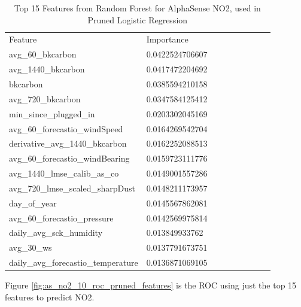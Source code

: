 \begin{table}[H]
\centering
\small
\begin{tabular}{lllllllll}
\\
\\
\toprule
Feature & Importance \\
\midrule
 avg\_60\_bkcarbon & 0.0422524706607 \\
 avg\_1440\_bkcarbon & 0.0417472204692 \\
 bkcarbon & 0.0385594210158 \\
 avg\_720\_bkcarbon & 0.0347584125412 \\
 min\_since\_plugged\_in & 0.0203302045169 \\
 avg\_60\_forecastio\_windSpeed & 0.0164269542704 \\
 derivative\_avg\_1440\_bkcarbon & 0.0162252088513 \\
 avg\_60\_forecastio\_windBearing & 0.0159723111776 \\
 avg\_1440\_lmse\_calib\_as\_co & 0.0149001557286 \\
 avg\_720\_lmse\_scaled\_sharpDust & 0.0148211173957 \\
 day\_of\_year & 0.0145567862081 \\
 avg\_60\_forecastio\_pressure & 0.0142569975814 \\
 daily\_avg\_sck\_humidity & 0.013849933762 \\
 avg\_30\_ws & 0.0137791673751 \\
 daily\_avg\_forecastio\_temperature & 0.0136871069105 \\
\bottomrule
\end{tabular}
\label{tab:as_no2_randomforest_features}
\caption{Top 15 Features from Random Forest for AlphaSense NO2, used in Pruned Logistic Regression}
\end{table}

Figure \ref{fig:as_no2_10_roc_pruned_features} is the ROC using just the top 15 features to predict NO2.

